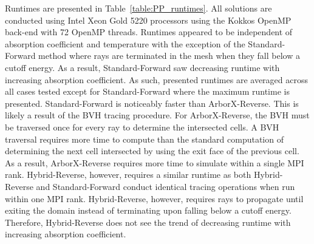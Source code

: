Runtimes are presented in Table~\ref{table:PP_runtimes}. All solutions are conducted using Intel Xeon Gold 5220 processors using the Kokkos OpenMP back-end with 72 OpenMP threads. Runtimes appeared to be independent of absorption coefficient and temperature with the exception of the Standard-Forward method where rays are terminated in the mesh when they fall below a cutoff energy. As a result, Standard-Forward saw decreasing runtime with increasing absorption coefficient. As such, presented runtimes are averaged across all cases tested except for Standard-Forward where the maximum runtime is presented. Standard-Forward is noticeably faster than ArborX-Reverse. This is likely a result of the BVH tracing procedure. For ArborX-Reverse, the BVH must be traversed once for every ray to determine the intersected cells. A BVH traversal requires more time to compute than the standard computation of determining the next cell intersected by using the exit face of the previous cell. As a result, ArborX-Reverse requires more time to simulate within a single MPI rank. Hybrid-Reverse, however, requires a similar runtime as both Hybrid-Reverse and Standard-Forward conduct identical tracing operations when run within one MPI rank. Hybrid-Reverse, however, requires rays to propagate until exiting the domain instead of terminating upon falling below a cutoff energy. Therefore, Hybrid-Reverse does not see the trend of decreasing runtime with increasing absorption coefficient.

